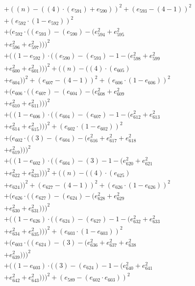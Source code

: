 \documentclass[10pt, a4paper]{article}
\begin{document}
\begin{small}
\begin{align*}
& + ((n) - ((4)  \cdot  (e_{591}) + e_{590}))^{2} + (e_{593} - (4 - 1))^{2} \\
& + (e_{592}  \cdot  (1 - e_{592}))^{2} \\
& + (e_{592}  \cdot  ((e_{593}) - (e_{590}) - (e_{594}^{2} + e_{595}^{2} \\
& + e_{596}^{2} + e_{597}^{2})))^{2} \\
& + ((1 - e_{592})  \cdot  ((e_{590}) - (e_{593}) - 1 - (e_{598}^{2} + e_{599}^{2} \\
& + e_{600}^{2} + e_{601}^{2})))^{2} + ((n) - ((4)  \cdot  (e_{605}) \\
& + e_{604}))^{2} + (e_{607} - (4 - 1))^{2} + (e_{606}  \cdot  (1 - e_{606}))^{2} \\
& + (e_{606}  \cdot  ((e_{607}) - (e_{604}) - (e_{608}^{2} + e_{609}^{2} \\
& + e_{610}^{2} + e_{611}^{2})))^{2} \\
& + ((1 - e_{606})  \cdot  ((e_{604}) - (e_{607}) - 1 - (e_{612}^{2} + e_{613}^{2} \\
& + e_{614}^{2} + e_{615}^{2})))^{2} + (e_{602}  \cdot  (1 - e_{602}))^{2} \\
& + (e_{602}  \cdot  ((3) - (e_{604}) - (e_{616}^{2} + e_{617}^{2} + e_{618}^{2} \\
& + e_{619}^{2})))^{2} \\
& + ((1 - e_{602})  \cdot  ((e_{604}) - (3) - 1 - (e_{620}^{2} + e_{621}^{2} \\
& + e_{622}^{2} + e_{623}^{2})))^{2} + ((n) - ((4)  \cdot  (e_{625}) \\
& + e_{624}))^{2} + (e_{627} - (4 - 1))^{2} + (e_{626}  \cdot  (1 - e_{626}))^{2} \\
& + (e_{626}  \cdot  ((e_{627}) - (e_{624}) - (e_{628}^{2} + e_{629}^{2} \\
& + e_{630}^{2} + e_{631}^{2})))^{2} \\
& + ((1 - e_{626})  \cdot  ((e_{624}) - (e_{627}) - 1 - (e_{632}^{2} + e_{633}^{2} \\
& + e_{634}^{2} + e_{635}^{2})))^{2} + (e_{603}  \cdot  (1 - e_{603}))^{2} \\
& + (e_{603}  \cdot  ((e_{624}) - (3) - (e_{636}^{2} + e_{637}^{2} + e_{638}^{2} \\
& + e_{639}^{2})))^{2} \\
& + ((1 - e_{603})  \cdot  ((3) - (e_{624}) - 1 - (e_{640}^{2} + e_{641}^{2} \\
& + e_{642}^{2} + e_{643}^{2})))^{2} + (e_{589} - (e_{602}  \cdot  e_{603}))^{2} \\

\end{align*}
\end{small}
\end{document}
